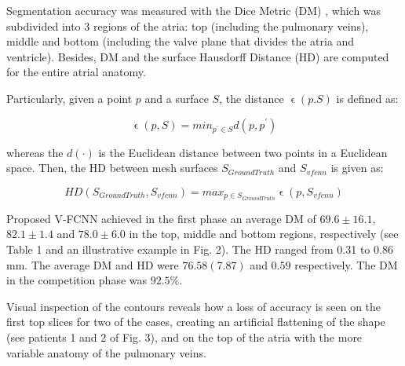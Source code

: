\documentclass{llncs}
\begin{document}
Segmentation accuracy was measured with the Dice Metric (DM) \cite{Avendi}, which was subdivided into 3 regions of the atria: top (including the pulmonary veins), middle and bottom (including the valve plane that divides the atria and ventricle). Besides, DM and the surface Hausdorff Distance (HD) \cite{Cignoni} are computed for the entire atrial anatomy.

Particularly, given a point $p$ and a surface $S$, the distance $\upvarepsilon(p.S)$ is defined as:

\begin{equation}
\upvarepsilon(p,S)= min_{p^{'} \in S} d(p,p^{'})
\end{equation}

whereas the $d(\cdot)$ is the Euclidean distance between two points in a Euclidean space.
Then, the HD between mesh surfaces $S_{GroundTruth}$ and $S_{vfcnn}$ is given as:

\begin{equation}
HD(S_{GroundTruth},S_{vfcnn}) = max_{p \in S_{GroundTruth}} \upvarepsilon(p,S_{vfcnn})
\end{equation}


Proposed V-FCNN achieved in the first phase an average DM of $69.6 \pm 16.1$, $82.1 \pm 1.4$ and $78.0 \pm 6.0$ in the top, middle and bottom regions, respectively (see Table 1 and an illustrative example in Fig. 2). The HD ranged from 0.31 to 0.86 mm. The average DM and HD were $76.58(7.87)$ and $0.59$ respectively. The DM in the competition phase was $92.5\%$.

Visual inspection of the contours reveals how a loss of accuracy is seen on the first top slices for two of the cases, creating an artificial flattening of the shape (see patients 1 and 2 of Fig. 3), and on the top of the atria with the more variable anatomy of the pulmonary veins.
\end{document}
